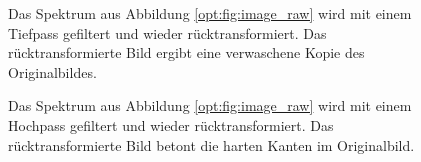 \begin{figure}
    \centering

    \caption{Das Spektrum aus Abbildung \ref{opt:fig:image_raw} wird mit einem Tiefpass gefiltert und wieder rücktransformiert.
    Das rücktransformierte Bild ergibt eine verwaschene Kopie des Originalbildes.}
    \label{opt:fig:image_lowpass}
\end{figure}

\begin{figure}
    \centering

    \caption{Das Spektrum aus Abbildung \ref{opt:fig:image_raw} wird mit einem Hochpass gefiltert und wieder rücktransformiert.
    Das rücktransformierte Bild betont die harten Kanten im Originalbild.}
    \label{opt:fig:image_highpass}
\end{figure}
